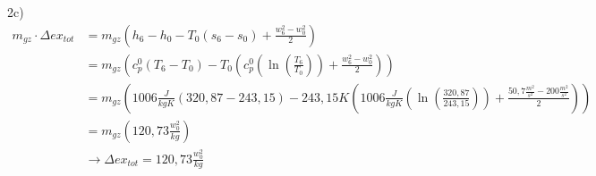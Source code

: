 2c) 
\begin{align*}
m_{gz} \cdot \Delta ex_{tot} &= m_{gz} \left( h_6 - h_0 - T_0 \left( s_6 - s_0 \right) + \frac{w_6^2 - w_0^2}{2} \right) \\
&= m_{gz} \left( c_p^0 \left( T_6 - T_0 \right) - T_0 \left( c_p^0 \left( \ln \left( \frac{T_6}{T_0} \right) \right) + \frac{w_6^2 - w_0^2}{2} \right) \right) \\
&= m_{gz} \left( 1006 \frac{J}{kgK} \left( 320,87 - 243,15 \right) - 243,15 K \left( 1006 \frac{J}{kgK} \left( \ln \left( \frac{320,87}{243,15} \right) \right) + \frac{50,7 \frac{m^2}{s^2} - 200 \frac{m^2}{s^2}}{2} \right) \right) \\
&= m_{gz} \left( 120,73 \frac{w_0^2}{kg} \right) \\
&\rightarrow \Delta ex_{tot} = 120,73 \frac{w_0^2}{kg}
\end{align*}